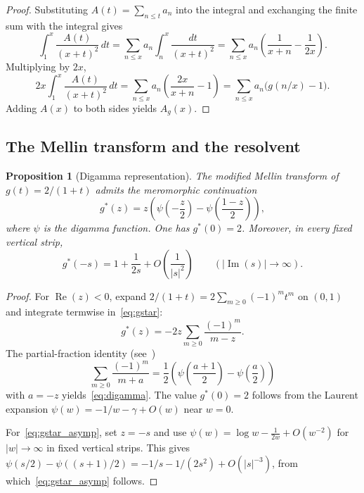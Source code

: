 \documentclass[11pt]{amsart}
\newtheorem{proposition}[theorem]{Proposition}
\theoremstyle{definition}
\theoremstyle{remark}
\newcommand{\Real}{\operatorname{Re}}
\newcommand{\Imag}{\operatorname{Im}}
\begin{document}
\begin{proof}
Substituting $A(t) = \sum_{n \leq t} a_n$ into the integral and exchanging the finite sum with the integral gives
$$
\int_1^x \frac{A(t)}{(x+t)^2}\, dt = \sum_{n \leq x} a_n \int_n^x \frac{dt}{(x+t)^2} = \sum_{n \leq x} a_n \left(\frac{1}{x+n} - \frac{1}{2x}\right).
$$
Multiplying by $2x$,
$$
2x \int_1^x \frac{A(t)}{(x+t)^2}\, dt = \sum_{n \leq x} a_n \left(\frac{2x}{x+n} - 1\right) = \sum_{n \leq x} a_n \bigl(g(n/x) - 1\bigr).
$$
Adding $A(x)$ to both sides yields $A_g(x)$.
\end{proof}


\subsection{The Mellin transform and the resolvent}

\begin{proposition}[Digamma representation]\label{prop:digamma}
The modified Mellin transform of $g(t) = 2/(1+t)$ admits the meromorphic continuation
\begin{equation}\label{eq:digamma}
g^*(z) = z\!\left(\psi\!\left(-\frac{z}{2}\right) - \psi\!\left(\frac{1-z}{2}\right)\right),
\end{equation}
where $\psi$ is the digamma function. One has $g^*(0) = 2$. Moreover, in every fixed vertical strip,
\begin{equation}\label{eq:gstar_asymp}
g^*(-s) = 1 + \frac{1}{2s} + O\!\left(\frac{1}{|s|^2}\right) \qquad (|\Imag(s)| \to \infty).
\end{equation}
\end{proposition}

\begin{proof}
For $\Real(z) < 0$, expand $2/(1+t) = 2\sum_{m \geq 0} (-1)^m t^m$ on $(0,1)$ and integrate termwise in~\eqref{eq:gstar}:
$$
g^*(z) = -2z \sum_{m \geq 0} \frac{(-1)^m}{m - z}.
$$
The partial-fraction identity (see~\cite[5.7.6]{DLMF})
$$
\sum_{m \geq 0} \frac{(-1)^m}{m + a} = \frac{1}{2}\!\left(\psi\!\left(\frac{a+1}{2}\right) - \psi\!\left(\frac{a}{2}\right)\right)
$$
with $a = -z$ yields~\eqref{eq:digamma}. The value $g^*(0) = 2$ follows from the Laurent expansion $\psi(w) = -1/w - \gamma + O(w)$ near $w = 0$.

For~\eqref{eq:gstar_asymp}, set $z = -s$ and use $\psi(w) = \log w - \frac{1}{2w} + O(w^{-2})$ for $|w| \to \infty$ in fixed vertical strips. This gives $\psi(s/2) - \psi((s+1)/2) = -1/s - 1/(2s^2) + O(|s|^{-3})$, from which~\eqref{eq:gstar_asymp} follows.
\end{proof}
\end{document}
